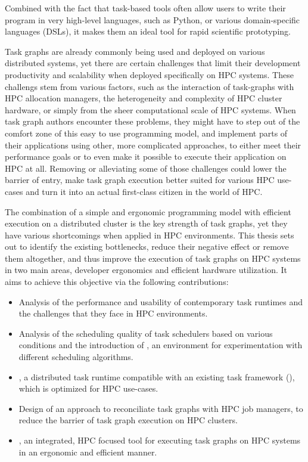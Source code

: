 Combined with the fact that task-based tools often allow users to write their program in very
high-level languages, such as Python, or various domain-specific languages (DSLs), it makes them an
ideal tool for rapid scientific prototyping.

Task graphs are already commonly being used and deployed on various distributed
systems, yet there are certain challenges that limit their development
productivity and scalability when deployed specifically on HPC systems. These challengs stem from
various factors, such as the interaction of task-graphs with HPC allocation managers, the
heterogeneity and complexity of HPC cluster hardware, or simply from the sheer computational scale
of HPC systems. When task graph authors encounter these problems, they might have to step out of
the comfort zone of this easy to use programming model, and implement parts of their applications
using other, more complicated approaches, to either meet their performance goals or to even make it
possible to execute their application on HPC at all. Removing or alleviating some of those
challenges could lower the barrier of entry, make task graph execution better suited for various
HPC use-cases and turn it into an actual first-class citizen in the world of HPC\@.

The combination of a simple and ergonomic programming model with efficient execution on a
distributed cluster is the key strength of task graphs, yet they have various shortcomings when
applied in HPC environments. This thesis sets out to identify the existing bottlenecks, reduce
their negative effect or remove them altogether, and thus improve the execution of task graphs on
HPC systems in two main areas, developer ergonomics and efficient hardware utilization. It aims to
achieve this objective via the following contributions:
\begin{itemize}
    \item Analysis of the performance and usability of contemporary task runtimes and the challenges that
    they face in HPC environments.
    \item Analysis of the scheduling quality of task schedulers based on various conditions and the
    introduction of \estee{}, an environment for experimentation with different scheduling
    algorithms.
    \item \rsds{}, a distributed task runtime compatible with an existing task framework
    (\dask{}), which is optimized for HPC use-cases.
    \item Design of an approach to reconciliate task graphs with HPC job managers, to reduce the barrier of
    task graph execution on HPC clusters.
    \item \hyperqueue{}, an integrated, HPC focused tool for executing task graphs on HPC systems
    in an ergonomic and efficient manner.
\end{itemize}

